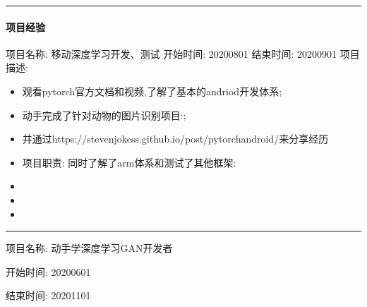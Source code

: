 \documentclass[letterpaper,11pt,english]{sphinxmanual}
\begin{document}
\bigskip\hrule\bigskip



\paragraph{项目经验}
\label{\detokenize{get_started:id4}}
项目名称: 移动深度学习开发、测试 开始时间: 2020\sphinxhyphen{}08\sphinxhyphen{}01 结束时间:
2020\sphinxhyphen{}09\sphinxhyphen{}01 项目描述:
\begin{itemize}
\item {} 
观看pytorch官方文档和视频,了解了基本的andriod开发体系;

\item {} 
动手完成了针对动物的图片识别项目:;

\item {} 
并通过https://stevenjokess.github.io/post/pytorch\sphinxhyphen{}android/来分享经历

\item {} 
项目职责: 同时了解了arm体系和测试了其他框架:

\item {} 

\item {} 

\item {} 

\end{itemize}


\bigskip\hrule\bigskip


项目名称: 动手学深度学习GAN开发者

开始时间: 2020\sphinxhyphen{}06\sphinxhyphen{}01

结束时间: 2020\sphinxhyphen{}11\sphinxhyphen{}01
\end{document}
